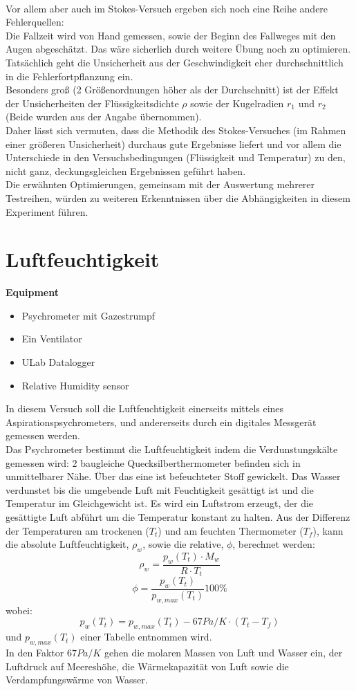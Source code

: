 \documentclass[12pt,a4paper]{article}
\begin{document}
\begin{multicols}{2}
\\
Vor allem aber auch im Stokes-Versuch ergeben sich noch eine Reihe andere Fehlerquellen:\\
Die Fallzeit wird von Hand gemessen, sowie der Beginn des Fallweges mit den Augen abgeschätzt. Das wäre sicherlich durch weitere Übung noch zu optimieren. Tatsächlich geht die Unsicherheit aus der Geschwindigkeit eher durchschnittlich in die Fehlerfortpflanzung ein.\\
Besonders groß (2 Größenordnungen höher als der Durchschnitt) ist der Effekt der Unsicherheiten der Flüssigkeitsdichte $\rho$ sowie der Kugelradien $r_1$ und $r_2$ (Beide wurden aus der Angabe übernommen).\\
Daher lässt sich vermuten, dass die Methodik des Stokes-Versuches (im Rahmen einer größeren Unsicherheit) durchaus gute Ergebnisse liefert und vor allem die Unterschiede in den Versuchsbedingungen (Flüssigkeit und Temperatur) zu den, nicht ganz, deckungsgleichen Ergebnissen geführt haben.\\
Die erwähnten Optimierungen, gemeinsam mit der Auswertung mehrerer Testreihen, würden zu weiteren Erkenntnissen über die Abhängigkeiten in diesem Experiment führen.





\section{Luftfeuchtigkeit}
\textbf{Equipment}
\begin{itemize}
	\item Psychrometer mit Gazestrumpf
	\item Ein Ventilator
	\item ULab Datalogger
	\item Relative Humidity sensor
\end{itemize}

\noindent 
In diesem Versuch soll die Luftfeuchtigkeit einerseits mittels eines Aspirationspsychrometers, und andererseits durch ein digitales Messgerät gemessen werden.\\
Das Psychrometer bestimmt die Luftfeuchtigkeit indem die Verdunstungskälte gemessen wird: 2 baugleiche Quecksilberthermometer befinden sich in unmittelbarer Nähe. Über das eine ist befeuchteter Stoff gewickelt. Das Wasser verdunstet bis die umgebende Luft mit Feuchtigkeit gesättigt ist und die Temperatur im Gleichgewicht ist. Es wird ein Luftstrom erzeugt, der die gesättigte Luft abführt um die Temperatur konstant zu halten. Aus der Differenz der Temperaturen am trockenen ($T_t$) und am feuchten Thermometer ($T_f$), kann die absolute Luftfeuchtigkeit, $\rho_w$, sowie die relative, $\phi$, berechnet werden:\\
$$\rho_w=\frac{p_w(T_t)\cdot M_w}{R \cdot T_t}$$
$$\phi= \frac{p_w(T_t)}{p_{w,max}(T_t)}100\%$$
wobei:
$$p_w(T_t)=p_{w,max}(T_t)-67 Pa/K \cdot (T_t-T_f)$$
und $p_{w,max}(T_t)$ einer Tabelle entnommen wird.\\
In den Faktor $67Pa/K$ gehen die molaren Massen von Luft und Wasser ein, der Luftdruck auf Meereshöhe, die Wärmekapazität von Luft sowie die Verdampfungswärme von Wasser.


\end{multicols}
\end{document}
